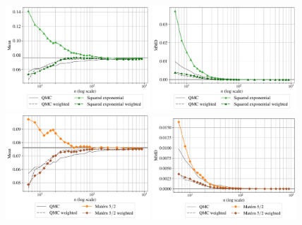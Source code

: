 \begin{figure}[!h]
\begin{center}
    \includegraphics[width=0.48\textwidth]{part2/figures/DCE/analytical_bench/GSobol_10D_(normal_input)_convergence_SE.pdf}
    \includegraphics[width=0.48\textwidth]{part2/figures/DCE/analytical_bench/GSobol_10D_(normal_input)_convergence_MMD_SE.pdf}\\
    \includegraphics[width=0.48\textwidth]{part2/figures/DCE/analytical_bench/GSobol_10D_(normal_input)_convergence_Matern.pdf}
    \includegraphics[width=0.48\textwidth]{part2/figures/DCE/analytical_bench/GSobol_10D_(normal_input)_convergence_MMD_Matern.pdf}\\

\end{center}
\end{figure}
